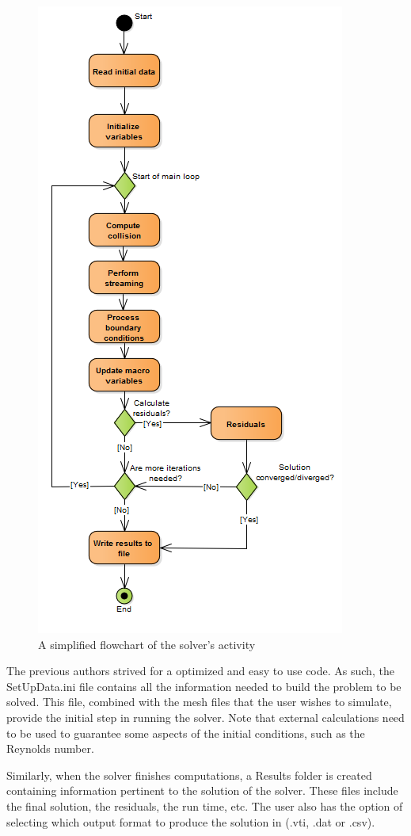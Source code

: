 \documentclass[12pt]{book}
\begin{document}
\begin{figure}[H]
	\centering
	\includegraphics[width=0.5\linewidth]{Resources/Images/CodeFlowchart.png}
	\caption{A simplified flowchart of the solver's activity}
	\label{fig:codeFlow}
\end{figure}

The previous authors strived for a optimized and easy to use code. As such, the SetUpData.ini file contains all the information needed to build the problem to be solved. This file, combined with the mesh files that the user wishes to simulate, provide the initial step in running the solver. Note that external calculations need to be used to guarantee some aspects of the initial conditions, such as the Reynolds number.\par
Similarly, when the solver finishes computations, a Results folder is created containing information pertinent to the solution of the solver. These files include the final solution, the residuals, the run time, etc. The user also has the option of selecting which output format to produce the solution in (.vti, .dat or .csv).
\end{document}
